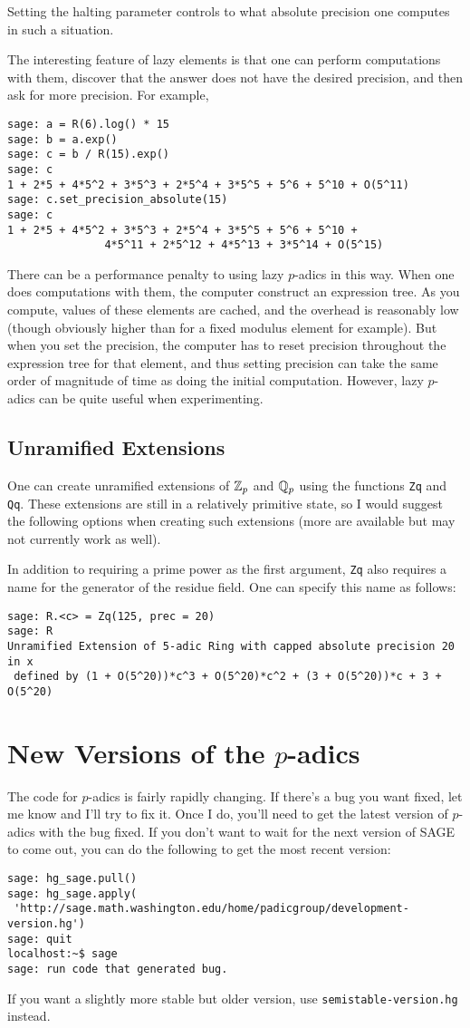 \documentclass[12pt]{article}
\begin{document}
Setting the halting parameter controls to what absolute precision one computes in such a situation.

The interesting feature of lazy elements is that one can perform computations with them, discover that the answer does not have the desired precision, and then ask for more precision.  For example,
\begin{verbatim}
sage: a = R(6).log() * 15
sage: b = a.exp()
sage: c = b / R(15).exp()
sage: c
1 + 2*5 + 4*5^2 + 3*5^3 + 2*5^4 + 3*5^5 + 5^6 + 5^10 + O(5^11)
sage: c.set_precision_absolute(15)
sage: c
1 + 2*5 + 4*5^2 + 3*5^3 + 2*5^4 + 3*5^5 + 5^6 + 5^10 + 
               4*5^11 + 2*5^12 + 4*5^13 + 3*5^14 + O(5^15)
\end{verbatim}

There can be a performance penalty to using lazy $p$-adics in this way.  When one does computations with them, the computer construct an expression tree.  As you compute, values of these elements are cached, and the overhead is reasonably low (though obviously higher than for a fixed modulus element for example).  But when you set the precision, the computer has to reset precision throughout the expression tree for that element, and thus setting precision can take the same order of magnitude of time as doing the initial computation.  However, lazy $p$-adics can be quite useful when experimenting.

\subsection{Unramified Extensions}
One can create unramified extensions of $\mathbb{Z}_p$ and $\mathbb{Q}_p$ using the functions \verb/Zq/ and \verb/Qq/.
These extensions are still in a relatively primitive state,
so I would suggest the following options when creating such extensions (more are available but may
not currently work as well).

In addition to requiring a prime power as the first argument, \verb/Zq/ also requires a name for the generator of the residue field.  One can specify this name as follows:
\begin{verbatim}
sage: R.<c> = Zq(125, prec = 20)
sage: R 
Unramified Extension of 5-adic Ring with capped absolute precision 20 in x
 defined by (1 + O(5^20))*c^3 + O(5^20)*c^2 + (3 + O(5^20))*c + 3 + O(5^20)
\end{verbatim}

\section{New Versions of the $p$-adics}
The code for $p$-adics is fairly rapidly changing.  If there's a bug you want fixed, let me know and I'll try to fix it.  Once I do, you'll need to get the latest version of $p$-adics with the bug fixed.  If you don't want to wait for the next version of SAGE to come out, you can do the following to get the most recent version:
\begin{verbatim}
sage: hg_sage.pull()
sage: hg_sage.apply(
 'http://sage.math.washington.edu/home/padicgroup/development-version.hg')
sage: quit
localhost:~$ sage
sage: run code that generated bug.
\end{verbatim}

If you want a slightly more stable but older version, use \verb/semistable-version.hg/ instead.
\end{document}
